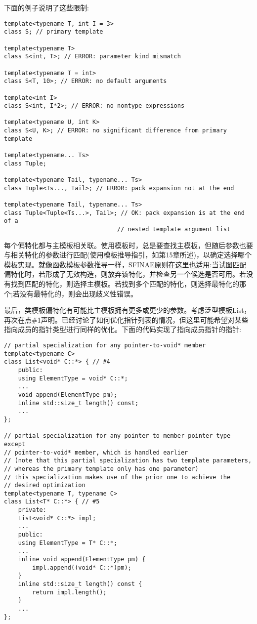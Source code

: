 下面的例子说明了这些限制:

\begin{lstlisting}[style=styleCXX]
template<typename T, int I = 3>
class S; // primary template

template<typename T>
class S<int, T>; // ERROR: parameter kind mismatch

template<typename T = int>
class S<T, 10>; // ERROR: no default arguments

template<int I>
class S<int, I*2>; // ERROR: no nontype expressions

template<typename U, int K>
class S<U, K>; // ERROR: no significant difference from primary template

template<typename... Ts>
class Tuple;

template<typename Tail, typename... Ts>
class Tuple<Ts..., Tail>; // ERROR: pack expansion not at the end

template<typename Tail, typename... Ts>
class Tuple<Tuple<Ts...>, Tail>; // OK: pack expansion is at the end of a
								// nested template argument list
\end{lstlisting}

每个偏特化都与主模板相关联。使用模板时，总是要查找主模板，但随后参数也要与相关特化的参数进行匹配(使用模板推导指引，如第15章所述)，以确定选择哪个模板实现。就像函数模板参数推导一样，SFINAE原则在这里也适用:当试图匹配偏特化时，若形成了无效构造，则放弃该特化，并检查另一个候选是否可用。若没有找到匹配的特化，则选择主模板。若找到多个匹配的特化，则选择最特化的那个;若没有最特化的，则会出现歧义性错误。

最后，类模板偏特化有可能比主模板拥有更多或更少的参数。考虑泛型模板List，再次在点\#1声明。已经讨论了如何优化指针列表的情况，但这里可能希望对某些指向成员的指针类型进行同样的优化。下面的代码实现了指向成员指针的指针:

\begin{lstlisting}[style=styleCXX]
// partial specialization for any pointer-to-void* member
template<typename C>
class List<void* C::*> { // #4
	public:
	using ElementType = void* C::*;
	...
	void append(ElementType pm);
	inline std::size_t length() const;
	...
};

// partial specialization for any pointer-to-member-pointer type except
// pointer-to-void* member, which is handled earlier
// (note that this partial specialization has two template parameters,
// whereas the primary template only has one parameter)
// this specialization makes use of the prior one to achieve the
// desired optimization
template<typename T, typename C>
class List<T* C::*> { // #5
	private:
	List<void* C::*> impl;
	...
	public:
	using ElementType = T* C::*;
	...
	inline void append(ElementType pm) {
		impl.append((void* C::*)pm);
	}
	inline std::size_t length() const {
		return impl.length();
	}
	...
};
\end{lstlisting}

